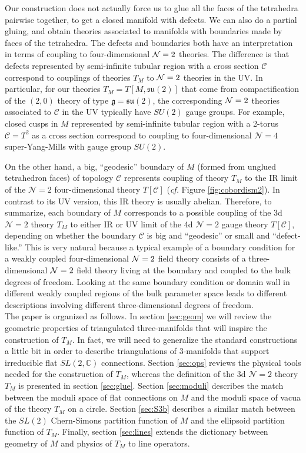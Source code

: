 \documentclass[hyper,letterpaper]{JHEP3}
\numberwithin{equation}{section}
\newcommand{\C}{{\mathbb C}}
\newcommand{\CC}{\mathcal{C}}
\newcommand{\CN}{\mathcal{N}}
\begin{document}
Our construction does not actually force us to glue all the faces of the tetrahedra pairwise together,
to get a closed manifold with defects. We can also do a partial gluing, and obtain theories associated
to manifolds with boundaries made by faces of the tetrahedra.
The defects and boundaries both have an interpretation in terms of coupling to four-dimensional ${\cal N}=2$ theories.
The difference is that defects represented by semi-infinite tubular region with a cross section $\CC$
correspond to couplings of theories $T_M$ to ${\cal N}=2$ theories in the UV.
In particular, for our theories $T_M = T[M,\mathfrak{su}(2)]$ that come from compactification of
the $(2,0)$ theory of type $\mathfrak{g} = \mathfrak{su}(2)$, the corresponding ${\cal N}=2$ theories
associated to $\CC$ in the UV typically have $SU(2)$ gauge groups.
For example, closed cusps in $M$ represented by semi-infinite tubular region with a 2-torus $\CC = T^2$
as a cross section correspond to coupling to four-dimensional $\CN=4$ super-Yang-Mills with gauge group $SU(2)$.

On the other hand, a big, ``geodesic'' boundary of $M$ (formed from unglued tetrahedron faces) of topology $\CC$ represents coupling
of theory $T_M$ to the IR limit of the $\CN=2$ four-dimensional theory $T[\CC]$ ({\it cf.} Figure \ref{fig:cobordism2}).
In contrast to its UV version, this IR theory is usually abelian.
Therefore, to summarize, each boundary of $M$ corresponds to a possible coupling of the 3d $\CN=2$ theory $T_M$
to either IR or UV limit of the 4d $\CN=2$ gauge theory $T[\CC]$, depending on whether the boundary $\CC$ is big and ``geodesic'' or small and ``defect-like.''
This is very natural because a typical example of a boundary condition for a weakly coupled four-dimensional ${\cal N}=2$ field theory
consists of a three-dimensional ${\cal N}=2$ field theory living at the boundary and coupled to the bulk degrees of freedom.
Looking at the same boundary condition or domain wall in different weakly coupled regions of the bulk parameter space
leads to different descriptions involving different three-dimensional degrees of freedom.\\

The paper is organized as follows.
In section \ref{sec:geom} we will review the geometric properties of triangulated three-manifolds
that will inspire the construction of $T_M$. In fact, we will need to generalize the standard constructions
a little bit in order to describe triangulations of 3-manifolds that support irreducible flat $SL(2,\C)$ connections.
Section \ref{sec:ops} reviews the physical tools needed for the construction of $T_M$,
whereas the definition of the 3d $\CN=2$ theory $T_M$ is presented in section \ref{sec:glue}.
Section \ref{sec:moduli} describes the match between the moduli space of flat connections on $M$
and the moduli space of vacua of the theory $T_M$ on a circle.
Section \ref{sec:S3b} describes a similar match between the $SL(2)$ Chern-Simons partition function of $M$
and the ellipsoid partition function of $T_M$.
Finally, section \ref{sec:lines} extends the dictionary between geometry of $M$ and physics of $T_M$ to line operators.
\end{document}
